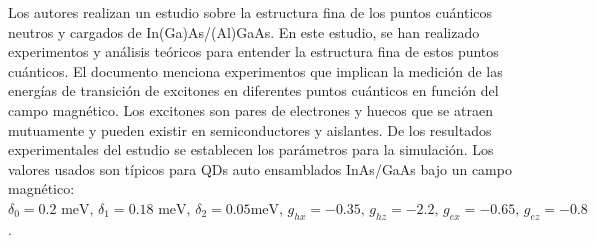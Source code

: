 \documentclass[main.tex]{subfiles}
\begin{document}
Los autores \parencite{Bayer2002} realizan un estudio sobre la estructura fina de los puntos cuánticos neutros y cargados de  In(Ga)As/(Al)GaAs. En este estudio, se han realizado experimentos y análisis teóricos para entender la estructura fina de estos puntos cuánticos. El documento menciona experimentos que implican la medición de las energías de transición de excitones en diferentes puntos cuánticos en función del campo magnético. Los excitones son pares de electrones y huecos que se atraen mutuamente y pueden existir en semiconductores y aislantes. De los resultados experimentales del estudio se establecen los parámetros para la simulación. Los valores usados son típicos para QDs auto ensamblados InAs/GaAs bajo un campo magnético: $\delta_0 = 0.2 \text{ meV}, \, \delta_1 = 0.18 \text{ meV},\, \delta_2 = 0.05 \text{meV},\, g_{hx} = -0.35,\, g_{hz} = -2.2,\, g_{ex} = -0.65,\, g_{ez} = -0.8$.
\end{document}
